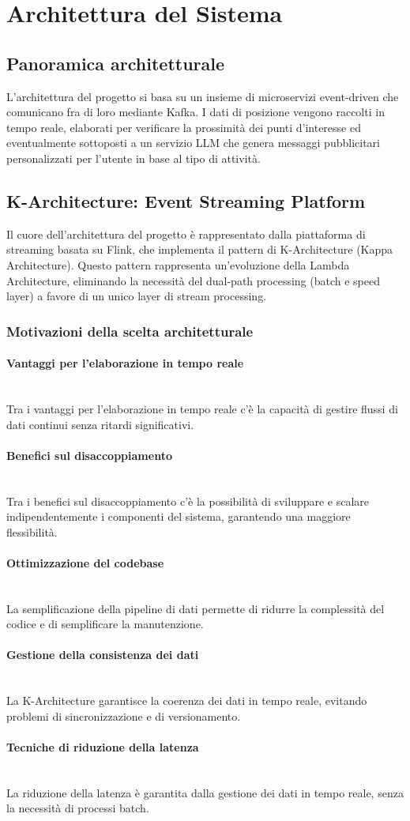 \documentclass[10pt]{article}
\newcommand{\myparagraph}[1]{\paragraph{#1}\mbox{}\\}
\begin{document}
\section{Architettura del Sistema}

\subsection{Panoramica architetturale}
L'architettura del progetto si basa su un insieme di microservizi event-driven che comunicano fra di loro mediante Kafka. I dati di posizione vengono raccolti in tempo reale, elaborati per verificare la prossimità dei punti d'interesse ed eventualmente sottoposti a un servizio LLM che genera messaggi pubblicitari personalizzati per l'utente in base al tipo di attività.

\subsection{K-Architecture: Event Streaming Platform}
Il cuore dell'architettura del progetto è rappresentato dalla piattaforma di streaming basata su Flink, che implementa il pattern di K-Architecture (Kappa Architecture). Questo pattern rappresenta un'evoluzione della Lambda Architecture, eliminando la necessità del dual-path processing (batch e speed layer) a favore di un unico layer di stream processing.
    \subsubsection{Motivazioni della scelta architetturale}
        \myparagraph{Vantaggi per l'elaborazione in tempo reale}
        Tra i vantaggi per l'elaborazione in tempo reale c'è la capacità di gestire flussi di dati continui senza ritardi significativi.
        \myparagraph{Benefici sul disaccoppiamento}
        Tra i benefici sul disaccoppiamento c'è la possibilità di sviluppare e scalare indipendentemente i componenti del sistema, garantendo una maggiore flessibilità.
        \myparagraph{Ottimizzazione del codebase}
        La semplificazione della pipeline di dati permette di ridurre la complessità del codice e di semplificare la manutenzione.
        \myparagraph{Gestione della consistenza dei dati}
        La K-Architecture garantisce la coerenza dei dati in tempo reale, evitando problemi di sincronizzazione e di versionamento.
        \myparagraph{Tecniche di riduzione della latenza}
        La riduzione della latenza è garantita dalla gestione dei dati in tempo reale, senza la necessità di processi batch.
\end{document}
